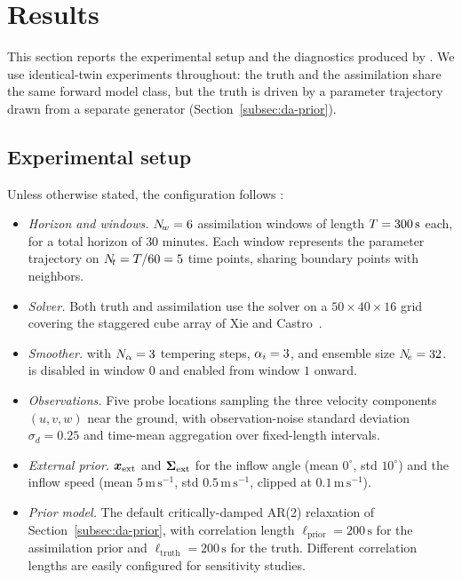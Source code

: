 \section{Results}
\label{sec:results}

This section reports the experimental setup and the diagnostics
produced by \rolloutscript{}.
We use identical-twin experiments throughout: the truth and the
assimilation share the same forward model class, but the truth is
driven by a parameter trajectory drawn from a separate generator
(Section~\ref{subsec:da-prior}).

\subsection{Experimental setup}
Unless otherwise stated, the configuration follows
:
\begin{itemize}
  \item \emph{Horizon and windows.} $N_{\!w} = 6$ assimilation windows of
        length $T = 300\,\mathrm{s}$ each, for a total
        horizon of $30$ minutes.  Each window represents the
        parameter trajectory on $N_{\!t} = T / 60 = 5$
        time points, sharing boundary points with neighbors.
  \item \emph{Solver.} Both truth and assimilation use the
        \pylbm{} solver on a $50 \times 40 \times 16$ grid covering
        the staggered cube array of Xie and
        Castro~\cite{xie2008castro}.
  \item \emph{Smoother.} \ESMDA{} with $N_{\alpha} = 3$ tempering
        steps, $\alpha_i = 3$, and ensemble size $N_{\!e} = 32$.
         is disabled in window $0$
        and enabled from window $1$ onward.
  \item \emph{Observations.} Five probe locations sampling the
        three velocity components $(u, v, w)$ near the ground, with
        observation-noise standard deviation $\sigma_d = 0.25$ and
        time-mean aggregation over fixed-length intervals.
  \item \emph{External prior.} $\boldsymbol{x}_{\mathrm{ext}}$ and $\boldsymbol{\Sigma}_{\mathrm{ext}}$ for the inflow
        angle (mean $0^\circ$, std $10^\circ$) and the inflow
        speed (mean $5\,\mathrm{m\,s^{-1}}$, std $0.5\,\mathrm{m\,s^{-1}}$,
        clipped at $0.1\,\mathrm{m\,s^{-1}}$).
  \item \emph{Prior model.} The default critically-damped AR(2)
        relaxation of Section~\ref{subsec:da-prior}, with
        correlation length $\ell_{\mathrm{prior}} =
        200\,\mathrm{s}$ for the assimilation prior and
        $\ell_{\mathrm{truth}} = 200\,\mathrm{s}$ for the truth.
        Different correlation lengths are easily configured for
        sensitivity studies.
\end{itemize}

